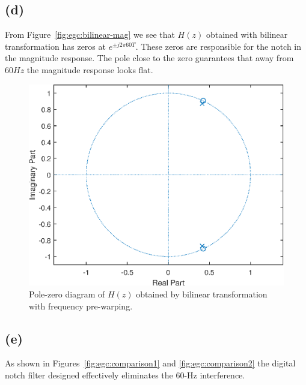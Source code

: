 \documentclass{article}
\begin{document}
\subsection{(d)}

From Figure~\ref{fig:egc:bilinear-mag} we see that $H(z)$ obtained with bilinear transformation has zeros at $e^{\pm j2\pi60T}$. These zeros are responsible for the notch in the magnitude response. The pole close to the zero guarantees that away from $60 Hz$ the magnitude response looks flat.  

\FloatBarrier
\begin{figure}[h!]
	\centering
	\includegraphics[scale=0.7]{figs/zplane_bilinear_ecg.eps}
	\caption{Pole-zero diagram of $H(z)$ obtained by bilinear transformation with frequency pre-warping.} \label{fig:egc:bilinear-zplane}
\end{figure}
\FloatBarrier

\subsection{(e)}

As shown in Figures~\ref{fig:egc:comparison1} and \ref{fig:egc:comparison2} the digital notch filter designed effectively eliminates the 60-Hz interference.
\end{document}
